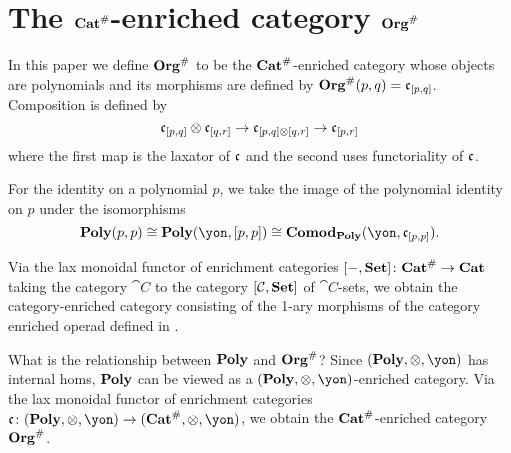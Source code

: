 \section{The $\mathbf{Cat}^\#$-enriched category $\mathbf{Org}^\#$}

In this paper we define $\mathbf{Org}^\#$ to be the $\mathbf{Cat}^\#$-enriched category whose objects are polynomials and its morphisms are defined by $\mathbf{Org}^\#(p, q) = \mathfrak{c}_{[p,q]}$. 
Composition is defined by 
\[
    \mathfrak{c}_{[p,q]} \otimes \mathfrak{c}_{[q,r]} \to \mathfrak{c}_{[p, q] \otimes [q, r]} \to \mathfrak{c}_{[p, r]}
\]
where the first map is the laxator of $\mathfrak{c}$ and the second uses functoriality of $\mathfrak{c}$.

For the identity on a polynomial $p$, we take the image of the polynomial identity on $p$ under the isomorphisms
\[
    \poly(p, p) \iso \poly(\yon , [p, p]) \iso \comodpoly(\yon, \cofree_{[p,p]}).
\]

Via the lax monoidal functor of enrichment categories $[-,\mathbf{Set}] \colon \mathbf{Cat}^\# \to \mathbf{Cat}$ taking the category $\cat{C}$ to the category $[\mathcal{C}, \mathbf{Set}]$ of $\cat{C}$-sets, we obtain the category-enriched category consisting of the 1-ary morphisms of the category enriched operad defined in \cite[Definition 2.19]{spivak2021learnersv1}.

\begin{remark}
    What is the relationship between $\mathbf{Poly}$ and $\mathbf{Org}^\#$? Since $(\poly, \otimes, \yon)$ has internal homs, $\mathbf{Poly}$ can be viewed as a $(\poly, \otimes, \yon)$-enriched category. Via the lax monoidal functor of enrichment categories $\cofree\colon (\poly, \otimes, \yon) \to (\smcat^\#, \otimes, \yon)$, we obtain the $\mathbf{Cat}^\#$-enriched category $\mathbf{Org}^\#$.
\end{remark}

